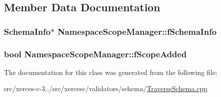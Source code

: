 \subsection{Member Data Documentation}
\hypertarget{classNamespaceScopeManager_ab599ce75e5bc2513740a19de597662fc}{
\subsubsection[{f\-Schema\-Info}]{\setlength{\rightskip}{0pt plus 5cm}Schema\-Info$\ast$ Namespace\-Scope\-Manager\-::f\-Schema\-Info\hspace{0.3cm}{\ttfamily [protected]}}}\label{classNamespaceScopeManager_ab599ce75e5bc2513740a19de597662fc}
\hypertarget{classNamespaceScopeManager_ad5f2ddc43903c521c6f16b628a584875}{
\subsubsection[{f\-Scope\-Added}]{\setlength{\rightskip}{0pt plus 5cm}bool Namespace\-Scope\-Manager\-::f\-Scope\-Added\hspace{0.3cm}{\ttfamily [protected]}}}\label{classNamespaceScopeManager_ad5f2ddc43903c521c6f16b628a584875}


The documentation for this class was generated from the following file\-:\begin{DoxyCompactItemize}
\item 
src/xerces-\/c-\/3../src/xercesc/validators/schema/\hyperlink{TraverseSchema_8cpp}{Traverse\-Schema.\-cpp}\end{DoxyCompactItemize}
